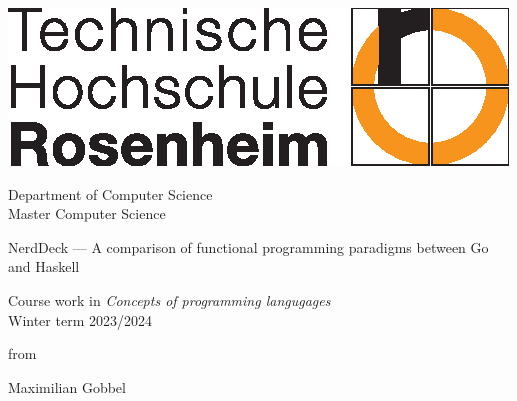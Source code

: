 \begin{titlepage}


\raggedleft

\vspace*{-2cm}

\includegraphics{logo-th-rosenheim-2019_master_quer_2c.eps}

\vfill

\centering
\LARGE
Department of Computer Science  \vspace{0.5cm}\\
\Large
Master Computer Science

\vspace{2cm}

\LARGE

NerdDeck --- A comparison of functional programming paradigms between Go and Haskell

\vspace{2cm}

\Large
Course work in \textit{Concepts of programming langugages}\vspace{0.5cm}\\
Winter term 2023/2024

\vspace{1.5cm}


\Large
from

\vspace{0.5cm}


\LARGE
Maximilian Gobbel \vspace{0cm}


\vspace{1cm}

\flushleft
 \Large
\vspace*{\fill}


\end{titlepage}

\cleardoubleemptypage

